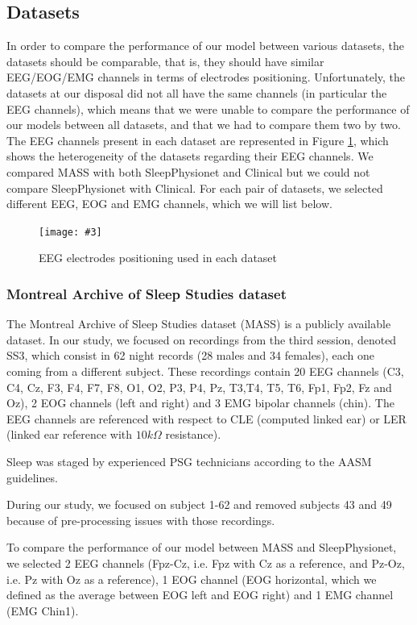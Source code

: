 \documentclass[titlepage, 11pt, a4paper, fancysections]{article}
\newcommand{\fig}[5]{\begin{figure}[#1] \centering \texttt{[image: \#3]} \caption{#4} \label{#5} \end{figure}}
\begin{document}
\subsection{Datasets}
In order to compare the performance of our model between various datasets, the datasets should be comparable, that is, they should have similar EEG/EOG/EMG channels in terms of electrodes positioning. Unfortunately, the datasets at our disposal did not all have the same channels (in particular the EEG channels), which means that we were unable to compare the performance of our models between all datasets, and that we had to compare them two by two. The EEG channels present in each dataset are represented in Figure \ref{fig:channels}, which shows the heterogeneity of the datasets regarding their EEG channels. We compared MASS with both SleepPhysionet and Clinical but we could not compare SleepPhysionet with Clinical. For each pair of datasets, we selected different EEG, EOG and EMG channels, which we will list below. 

\vspace{1cm}

\fig{!ht}{\linewidth}{EEG-channels.png}{EEG electrodes positioning used in each dataset}{fig:channels}

\subsubsection{Montreal Archive of Sleep Studies dataset}
The Montreal Archive of Sleep Studies dataset (MASS) \autocite{MASS} is a publicly available dataset. In our study, we focused on recordings from the third session, denoted SS3, which consist in 62 night records (28 males and 34 females), each one coming from a different subject. These recordings contain 20 EEG channels (C3, C4, Cz, F3, F4, F7, F8, O1, O2, P3, P4, Pz, T3,T4, T5, T6, Fp1, Fp2, Fz and Oz), 2 EOG channels (left and right) and 3 EMG bipolar channels (chin). The EEG channels are referenced with respect to CLE (computed linked ear) or LER (linked ear reference with $10k\Omega$ resistance). 

Sleep was staged by experienced PSG technicians according to the AASM guidelines.

During our study, we focused on subject 1-62 and removed subjects 43 and 49 because of pre-processing issues with those recordings. 

To compare the performance of our model between MASS and SleepPhysionet, we selected 2 EEG channels (Fpz-Cz, i.e. Fpz with Cz as a reference, and Pz-Oz, i.e. Pz with Oz as a reference), 1 EOG channel (EOG horizontal, which we defined as the average between EOG left and EOG right) and 1 EMG channel (EMG Chin1). 
\end{document}

